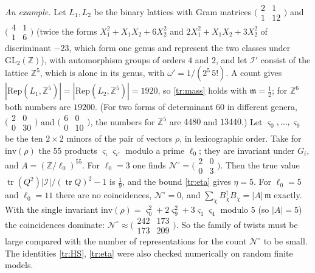 \documentclass[11pt,letterpaper]{article}
\newcommand{\Z}{\mathbb Z}\newcommand{\Q}{\mathbb Q}\newcommand{\C}{\mathbb C}
\begin{document}
\emph{An example.} Let $L_1,L_2$ be the binary lattices with Gram matrices
$\big(\begin{smallmatrix}2&1\\1&12\end{smallmatrix}\big)$ and $\big(\begin{smallmatrix}4&1\\1&6\end{smallmatrix}\big)$
(twice the forms $X_1^2+X_1X_2+6X_2^2$ and $2X_1^2+X_1X_2+3X_2^2$ of discriminant $-23$, which form one genus and represent the
two classes under $\mathrm{GL}_2(\Z)$), with automorphism groups of orders $4$ and $2$, and let $\mathcal I'$
consist of the lattice $\Z^5$, which is alone in its genus, with $\omega'=1/(2^5\,5!)$. A count gives
$|\mathrm{Rep}(L_1,\Z^5)|=|\mathrm{Rep}(L_2,\Z^5)|=1920$, so \eqref{tr:mass} holds with $\mathfrak m=\frac12$; for
$\Z^6$ both numbers are $19200$. (For two forms of determinant $60$ in different genera,
$\big(\begin{smallmatrix}2&0\\0&30\end{smallmatrix}\big)$ and $\big(\begin{smallmatrix}6&0\\0&10\end{smallmatrix}\big)$, the
numbers for $\Z^5$ are $4480$ and $13440$.) Let $\varsigma_0,\dots,\varsigma_9$ be the ten $2\times2$ minors of
the pair of vectors $\rho$, in lexicographic order. Take for $\mathrm{inv}(\rho)$ the $55$ products
$\varsigma_\iota\varsigma_{\iota'}$ modulo a prime $\ell_0$; they are invariant under $G_i$, and
$A=(\Z/\ell_0)^{55}$. For $\ell_0=3$ one finds
$\mathcal N^\circ=\big(\begin{smallmatrix}2&0\\0&3\end{smallmatrix}\big)$. Then the true value
$\operatorname{tr}(Q^2)|\mathcal I|/(\operatorname{tr}Q)^2-1$ is $\frac19$, and the bound \eqref{tr:eta} gives
$\eta=5$. For $\ell_0=5$ and $\ell_0=11$ there are no coincidences,
$\mathcal N^\circ=0$, and $\sum_\chi B_\chi^\dagger B_\chi=|A|\,\mathfrak m$ exactly. With the single invariant
$\mathrm{inv}(\rho)=\varsigma_0^2+2\varsigma_9^2+3\varsigma_1\varsigma_4$ modulo $5$ (so $|A|=5$) the
coincidences dominate: $\mathcal N^\circ\approx\big(\begin{smallmatrix}242&173\\173&209\end{smallmatrix}\big)$. So the family of
twists must be large compared with the number of representations for the count $\mathcal N^\circ$ to be small. The
identities \eqref{tr:HS}, \eqref{tr:eta} were also checked numerically on random finite models.
\end{document}
